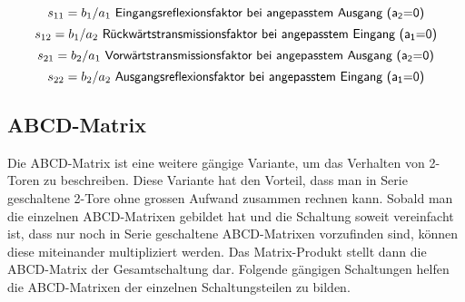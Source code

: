 \begin{equation}\label{equ:def_s11}
	s_{11} = b_1/a_1\textsf{ Eingangsreflexionsfaktor bei angepasstem Ausgang (a\textsubscript{2}=0)}
\end{equation}
\begin{equation}\label{equ:def_s12}
	s_{12} = b_1/a_2\textsf{ Rückwärtstransmissionsfaktor bei angepasstem Eingang (a\textsubscript{1}=0)}
\end{equation}
\begin{equation}\label{equ:def_s21}
	s_{21} = b_2/a_1\textsf{ Vorwärtstransmissionsfaktor bei angepasstem Ausgang (a\textsubscript{2}=0)}
\end{equation}
\begin{equation}\label{equ:def_s22}
	s_{22} = b_2/a_2\textsf{ Ausgangsreflexionsfaktor bei angepasstem Eingang (a\textsubscript{1}=0)}
\end{equation}
\newpage

\subsection{ABCD-Matrix}\label{ABCD-Matrix}
Die ABCD-Matrix ist eine weitere gängige Variante, um das Verhalten von 2-Toren zu beschreiben. Diese Variante hat den Vorteil, dass man in Serie 
geschaltene 2-Tore ohne grossen Aufwand zusammen rechnen kann. Sobald man die einzelnen ABCD-Matrixen gebildet hat und die Schaltung soweit vereinfacht ist, dass nur noch in Serie geschaltene ABCD-Matrixen vorzufinden sind, können diese miteinander multipliziert werden. Das Matrix-Produkt stellt dann die ABCD-Matrix der Gesamtschaltung dar. Folgende gängigen Schaltungen helfen die ABCD-Matrixen der einzelnen Schaltungsteilen zu bilden.

